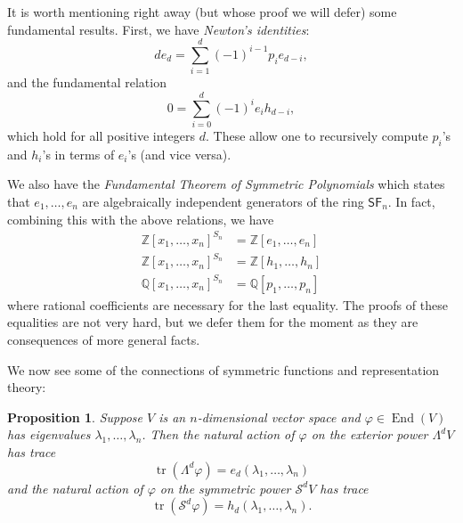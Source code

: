 \documentclass[12pt]{article}
\theoremstyle{plain}
\newtheorem{proposition}[theorem]{Proposition}
\theoremstyle{definition}
\theoremstyle{remark}
\numberwithin{equation}{section}
\begin{document}
It is worth mentioning right away (but whose proof we will defer)
some fundamental results.  First, we have \emph{Newton's identities}:
\[
de_d = \sum_{i=1}^d (-1)^{i-1} p_i e_{d-i} ,
\]
and the fundamental relation
\[
0 = \sum_{i=0}^d (-1)^i e_i h_{d-i},
\]
which hold for all positive integers $d$.
These allow one to recursively compute $p_i$'s and $h_i$'s in terms
of $e_i$'s (and vice versa).

We also have the \emph{Fundamental Theorem of Symmetric
Polynomials} which states that $e_1,\ldots,e_n$ are algebraically independent
generators of the ring $\mathsf{SF}_n$.
In fact, combining this with the above relations, we have
\begin{align*}
\mathbb{Z}[x_1,\ldots,x_n]^{S_n} &= \mathbb{Z}[e_1,\ldots,e_n]\\
\mathbb{Z}[x_1,\ldots,x_n]^{S_n} &= \mathbb{Z}[h_1,\ldots,h_n]\\
\mathbb{Q}[x_1,\ldots,x_n]^{S_n} &= \mathbb{Q}[p_1,\ldots,p_n]
\end{align*}
where rational coefficients are necessary for the last equality.
The proofs of these equalities are not very hard, but we defer them for
the moment as they are consequences of more general facts.

We now see some of the connections of symmetric functions and
representation theory:

\begin{proposition}
Suppose $V$ is an $n$-dimensional vector space and
$\varphi \in \operatorname{End}(V)$ has eigenvalues
$\lambda_1,\ldots,\lambda_n$.
Then the natural action of $\varphi$ on the exterior power $\Lambda^d V$
has trace
\[
\operatorname{tr}\left( \Lambda^d \varphi \right)
= e_d(\lambda_1,\ldots,\lambda_n)
\]
and the natural action of $\varphi$ on the symmetric power
$\mathcal{S}^d V$ has trace
\[
\operatorname{tr}\left( \mathcal{S}^d \varphi \right)
= h_d(\lambda_1,\ldots,\lambda_n).
\]
\end{proposition}
\end{document}
